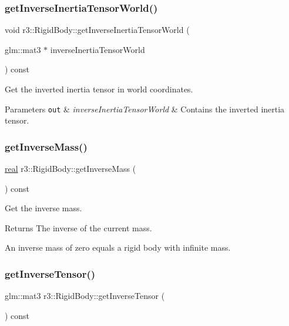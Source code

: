 \subsubsection{\texorpdfstring{get\+Inverse\+Inertia\+Tensor\+World()}{getInverseInertiaTensorWorld()}}
{\footnotesize\ttfamily void r3\+::\+Rigid\+Body\+::get\+Inverse\+Inertia\+Tensor\+World (\begin{DoxyParamCaption}\item[{glm\+::mat3 $\ast$}]{inverse\+Inertia\+Tensor\+World }\end{DoxyParamCaption}) const}



Get the inverted inertia tensor in world coordinates. 


\begin{DoxyParams}[1]{Parameters}
\mbox{\tt out}  & {\em inverse\+Inertia\+Tensor\+World} & Contains the inverted inertia tensor. \\
\hline
\end{DoxyParams}
\mbox{\label{classr3_1_1_rigid_body_a9a994b91ccc980c1dcc4ed43f71b6913}} 
\subsubsection{\texorpdfstring{get\+Inverse\+Mass()}{getInverseMass()}}
{\footnotesize\ttfamily \mbox{\hyperlink{namespacer3_ab2016b3e3f743fb735afce242f0dc1eb}{real}} r3\+::\+Rigid\+Body\+::get\+Inverse\+Mass (\begin{DoxyParamCaption}{ }\end{DoxyParamCaption}) const}



Get the inverse mass. 

\begin{DoxyReturn}{Returns}
The inverse of the current mass.
\end{DoxyReturn}
An inverse mass of zero equals a rigid body with infinite mass. \mbox{\label{classr3_1_1_rigid_body_a8a99ed119357d0cec8b77dfcb169dfab}} 
\subsubsection{\texorpdfstring{get\+Inverse\+Tensor()}{getInverseTensor()}}
{\footnotesize\ttfamily glm\+::mat3 r3\+::\+Rigid\+Body\+::get\+Inverse\+Tensor (\begin{DoxyParamCaption}{ }\end{DoxyParamCaption}) const}



